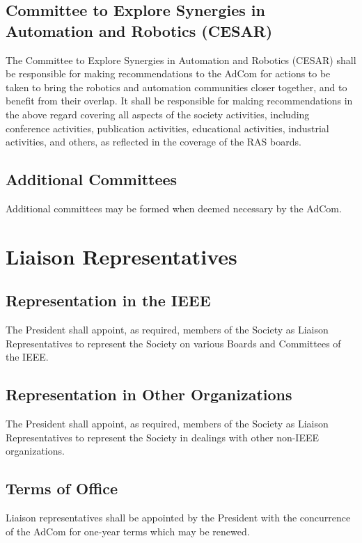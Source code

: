\documentclass[10pt]{article}
\begin{document}
\subsection{Committee to Explore Synergies in Automation and Robotics (CESAR)}

The Committee to Explore Synergies in Automation and Robotics (CESAR) shall be responsible for making recommendations to the AdCom for actions to be taken to bring the robotics and automation communities closer together, and to benefit from their overlap. It shall be responsible for making recommendations in the above regard covering all aspects of the society activities, including conference activities, publication activities, educational activities, industrial activities, and others, as reflected in the coverage of the RAS boards. 


\subsection{Additional Committees}

Additional committees may be formed when deemed necessary by the AdCom.   

\section{Liaison Representatives}
\subsection{Representation in the IEEE}

The President shall appoint, as required, members of the Society as Liaison Representatives to represent the Society on various Boards and Committees of the IEEE.

\subsection{Representation in Other Organizations}

The President shall appoint, as required, members of the Society as Liaison Representatives to represent the Society in dealings with other non-IEEE organizations.

\subsection{Terms of Office}

Liaison representatives shall be appointed by the President with the concurrence of the AdCom for one-year terms which may be renewed.
\end{document}
